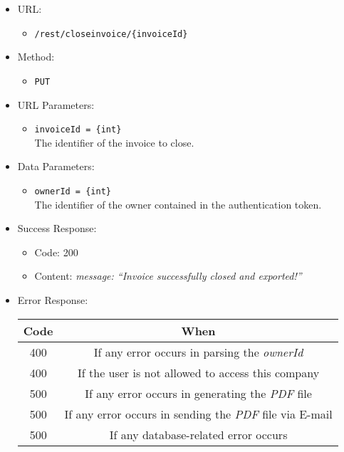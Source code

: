 \begin{itemize}

    \item URL:
    \begin{itemize}
        \item \texttt{/rest/closeinvoice/\{invoiceId\}}
    \end{itemize}

    \item Method:
    \begin{itemize}
        \item \texttt{PUT}
    \end{itemize}

    \item URL Parameters:
    \begin{itemize}
        \item \texttt{invoiceId = \{int\}} \\
        The identifier of the invoice to close.
    \end{itemize}

    \item Data Parameters:
    \begin{itemize}
        \item \texttt{ownerId = \{int\}} \\
        The identifier of the owner contained in the authentication token.
    \end{itemize}

    \item Success Response:
    \begin{itemize}
        \item Code: 200
        \item Content:
        \textit{
{
    message: “Invoice successfully closed and exported!”
}
        }
    \end{itemize}

    \item Error Response:
    \begin{table}[!h]
    \centering
    \begin{tabular}{|c|c|}
    \hline
    \multicolumn{1}{|c|}{\textbf{Code}} & \multicolumn{1}{c|}{\textbf{When}} \\ \hline
    400 & If any error occurs in parsing the \textit{ownerId}  \\\hline
    400 & If the user is not allowed to access this company \\\hline
    500 & If any error occurs in generating the \textit{PDF} file \\\hline
    500 & If any error occurs in sending the \textit{PDF} file via E-mail\\\hline
    500 & If any database-related error occurs \\\hline
    \end{tabular}
    \end{table}

\end{itemize}


